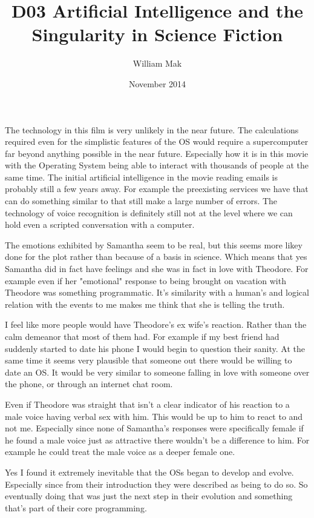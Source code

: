 \documentclass{article}
\title{D03 Artificial Intelligence and the Singularity in Science Fiction}
\author{William Mak}
\date{November 2014}
\begin{document}
\maketitle

The technology in this film is very unlikely in the near future. The
calculations required even for the simplistic features of the OS would require a
supercomputer far beyond anything possible in the near future. Especially how it
is in this movie with the Operating System being able to interact with thousands
of people at the same time. The initial artificial intelligence in the movie
reading emails is probably still a few years away. For example the preexisting
services we have that can do something similar to that still make a large number
of errors. The technology of voice recognition is definitely still not at the
level where we can hold even a scripted conversation with a computer. 

The emotions exhibited by Samantha seem to be real, but this seems more likey
done for the plot rather than because of a basis in science. Which means that
yes Samantha did in fact have feelings and she was in fact in love with
Theodore. For example even if her "emotional" response to being brought on
vacation with Theodore was something programmatic. It's similarity with a
human's and logical relation with the events to me makes me think that she is
telling the truth.

I feel like more people would have Theodore's ex wife's reaction. Rather than
the calm demeanor that most of them had. For example if my best friend had
suddenly started to date his phone I would begin to question their sanity. At
the same time it seems very plausible that someone out there would be willing to
date an OS. It would be very similar to someone falling in love with someone
over the phone, or through an internet chat room.

Even if Theodore was straight that isn't a clear indicator of his reaction to a
male voice having verbal sex with him. This would be up to him to react to and
not me. Especially since none of Samantha's responses were specifically female
if he found a male voice just as attractive there wouldn't be a difference to
him. For example he could treat the male voice as a deeper female one.

Yes I found it extremely inevitable that the OSs began to develop and evolve.
Especially since from their introduction they were described as being to do so.
So eventually doing that was just the next step in their evolution and something
that's part of their core programming.
\end{document}
